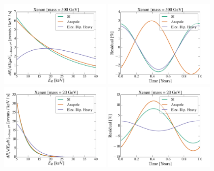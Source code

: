 \documentclass[11pt]{article}
\begin{document}
\begin{figure}
\centering
\includegraphics[width=0.49\textwidth, trim=0.cm 0.0cm 0.cm 0.0cm,clip=true]{plots/RecoilComparison_500GeV.pdf}
\includegraphics[width=0.49\textwidth, trim=0.cm 0.0cm 0.cm 0.0cm,clip=true]{plots/Xenon_SIvsAnapole_500GeV_Residual_Theory.pdf}
\includegraphics[width=0.49\textwidth, trim=0.cm 0.0cm 0.cm 0.0cm,clip=true]{plots/RecoilComparison_20GeV.pdf}
\includegraphics[width=0.49\textwidth, trim=0.cm 0.0cm 0.cm 0.0cm,clip=true]{plots/Xenon_SIvsAnapole_20GeV_Residual_Theory.pdf}

\end{figure}
\end{document}
